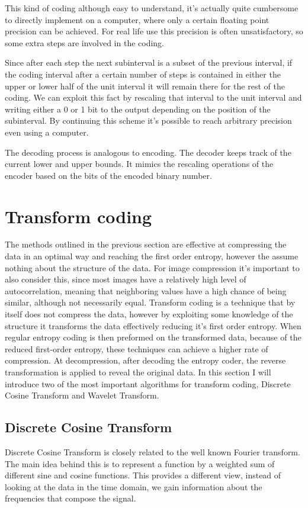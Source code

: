 \documentclass{diploma_style}
\begin{document}
This kind of coding although easy to understand, it's actually quite cumbersome to directly implement on a computer, where only a certain floating point precision can be achieved. For real life use this precision is often unsatisfactory, so some extra steps are involved in the coding.

Since after each step the next subinterval is a subset of the previous interval, if the coding interval after a certain number of steps is contained in either the upper or lower half of the unit interval it will remain there for the rest of the coding. We can exploit this fact by rescaling that interval to the unit interval and writing either a 0 or 1 bit to the output depending on the position of the subinterval. By continuing this scheme it's possible to reach arbitrary precision even using a computer.

The decoding process is analogous to encoding. The decoder keeps track of the
current lower and upper bounds. It mimics the rescaling operations of the encoder
based on the bits of the encoded binary number.

\section{Transform coding}
The methods outlined in the previous section are effective at compressing the data in an optimal way and reaching the first order entropy, however the assume nothing about the structure of the data. For image compression it's important to also consider this, since most images have a relatively high level of autocorrelation, meaning that neighboring values have a high chance of being similar, although not necessarily equal. Transform coding is a technique that by itself does not compress the data, however by exploiting some knowledge of the structure it transforms the data effectively reducing it's first order entropy. When regular entropy coding is then preformed on the transformed data, because of the reduced first-order entropy, these techniques can achieve a higher rate of compression. At decompression, after decoding the entropy coder, the reverse transformation is applied to reveal the original data. In this section I will introduce two of the most important algorithms for transform coding, Discrete Cosine Transform and Wavelet Transform.
\subsection{Discrete Cosine Transform}
Discrete Cosine Transform \cite{ahmed_discrete_1974} is closely related to the well known Fourier transform. The main idea behind this is to represent a function by a weighted sum of different sine and cosine functions. This provides a different view, instead of looking at the data in the time domain, we gain information about the frequencies that compose the signal. 
\end{document}
